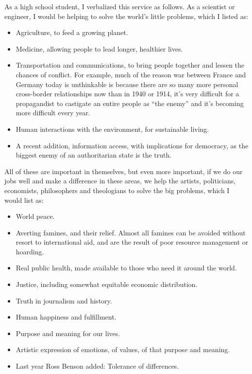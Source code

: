 \documentclass{report}
\begin{document}
As a high school student, I verbalized this service as follows.  As a scientist
or engineer, I would be helping to solve the world's little problems, which I
listed as:
\begin{itemize}
\item Agriculture, to feed a growing planet.
\item Medicine, allowing people to lead longer, healthier lives.
\item Transportation and communications, to bring people together and lessen
  the chances of conflict.  For example, much of the reason war between France
  and Germany today is unthinkable is because there are so many more personal
  cross-border relationships now than in 1940 or 1914, it's very difficult for
  a propagandist to castigate an entire people as ``the enemy'' and it's
  becoming more difficult every year.
\item Human interactions with the environment, for sustainable living.
\item A recent addition, information access, with implications for democracy,
  as the biggest enemy of an authoritarian state is the truth.
\end{itemize}

All of these are important in themselves, but even more important, if we do our
jobs well and make a difference in these areas, we help the artists,
politicians, economists, philosophers and theologians to solve the big
problems, which I would list as:
\begin{itemize}
\item World peace.
\item Averting famines, and their relief.  Almost all famines can be avoided
  without resort to international aid, and are the result of poor resource
  management or hoarding.
\item Real public health, made available to those who need it around the world.
\item Justice, including somewhat equitable economic distribution.
\item Truth in journalism and history.
\item Human happiness and fulfillment.
\item Purpose and meaning for our lives.
\item Artistic expression of emotions, of values, of that purpose and meaning.
\item Last year Ross Benson added: Tolerance of differences.
\end{itemize}
\end{document}
